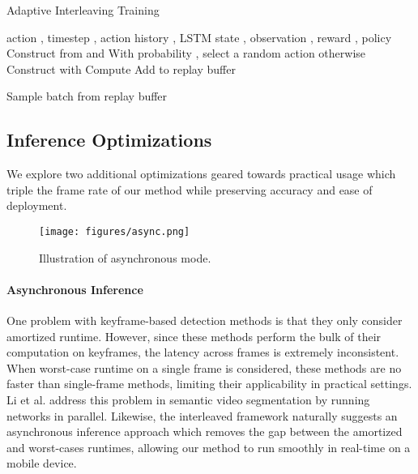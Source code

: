 \documentclass[10pt,twocolumn,letterpaper]{article}
\begin{document}
\begin{algorithm}
\caption{Adaptive Interleaving Training}
\renewcommand{\algorithmicrequire}{\textbf{Define:}}
\begin{algorithmic}[1]
\Require action , timestep , action history , LSTM state , observation , reward , policy 
\Repeat
\label{alg:training}
\State {} 
\State 
\While{}
\State 
\If{}
\State 
\EndIf
\State 
\EndFor
\State Construct  from  and 
\State With probability , select a random action 
\State otherwise 
\State Construct  with 
\State Compute 
\State Add  to replay buffer
\State 
\EndWhile

\State Sample batch  from replay buffer
\State  {} 
\end{algorithmic}
\end{algorithm}

\subsection{Inference Optimizations}
We explore two additional optimizations geared towards practical usage which triple the frame rate of our method while preserving accuracy and ease of deployment.

\begin{figure}[ht]
\begin{center}
  \texttt{[image: figures/async.png]}
  \vspace{-2em}
\end{center}
  \caption{Illustration of asynchronous mode.}
\label{fig:async}
\vspace{-0.5cm}
\end{figure}

\paragraph{\textbf{Asynchronous Inference}} One problem with keyframe-based detection methods is that they only consider amortized runtime. However, since these methods perform the bulk of their computation on keyframes, the latency across frames is extremely inconsistent. When worst-case runtime on a single frame is considered, these methods are no faster than single-frame methods, limiting their applicability in practical settings. Li et al. \cite{li2018low} address this problem in semantic video segmentation by running networks in parallel. Likewise, the interleaved framework naturally suggests an asynchronous inference approach which removes the gap between the amortized and worst-cases runtimes, allowing our method to run smoothly in real-time on a mobile device.
\end{document}
